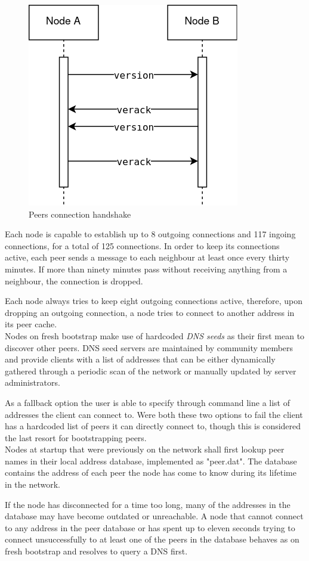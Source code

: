 \documentclass[12pt, letterpaper, twoside]{article}
\begin{document}
\begin{figure}[h]
	\includegraphics[width=.45\textwidth]{pict/BTCconnection.png}
	\centering
	\caption{Peers connection handshake}
	\label{fig:btcconn}
\end{figure}

Each node is capable to establish up to 8 outgoing connections and 117 ingoing connections, for a total of 125 connections. In order to keep its connections active, each peer sends a message to each neighbour at least once every thirty minutes. If more than ninety minutes pass without receiving anything from a neighbour, the connection is dropped.

Each node always tries to keep eight outgoing connections active, therefore, upon dropping an outgoing connection, a node tries to connect to another address in its peer cache.\\

Nodes on fresh bootstrap make use of hardcoded \emph{DNS seeds} as their first mean to discover other peers. DNS seed servers are maintained by community members and provide clients with a list of addresses that can be either dynamically gathered through a periodic scan of the network or manually updated by server administrators.

As a fallback option the user is able to specify through command line a list of addresses the client can connect to. Were both these two options to fail the client has a hardcoded list of peers it can directly connect to, though this is considered the last resort for bootstrapping peers.\\

Nodes at startup that were previously on the network shall first lookup peer names in their local address database, implemented as "peer.dat". The database contains the address of each peer the node has come to know during its lifetime in the network.

If the node has disconnected for a time too long, many of the addresses in the database may have become outdated or unreachable. A node that cannot connect to any address in the peer database or has spent up to eleven seconds trying to connect unsuccessfully to at least one of the peers in the database behaves as on fresh bootstrap and resolves to query a DNS first.
\end{document}

